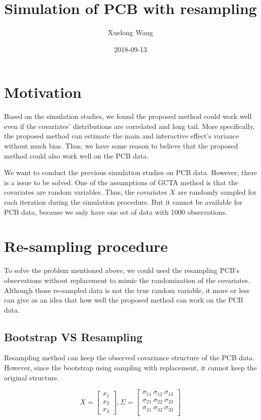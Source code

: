 \documentclass[]{article}
\title{Simulation of PCB with resampling}
\author{Xuelong Wang}
\date{2018-09-13}
\begin{document}
\maketitle

{
\setcounter{tocdepth}{2}
\tableofcontents
}
\section{Motivation}\label{motivation}

Based on the simulation studies, we found the proposed method could work
well even if the covariates' distributions are correlated and long tail.
More specifically, the proposed method can estimate the main and
interactive effect's variance without much bias. Thus, we have some
reason to believe that the proposed method could also work well on the
PCB data.

We want to conduct the previous simulation studies on PCB data. However,
there is a issue to be solved. One of the assumptions of GCTA method is
that the covariates are random variables. Thus, the covariates \(X\) are
randomly sampled for each iteration during the simulation procedure. But
it cannot be available for PCB data, because we only have one set of
data with 1000 observations.

\section{Re-sampling procedure}\label{re-sampling-procedure}

To solve the problem mentioned above, we could used the resampling PCB's
observations without replacement to mimic the randomization of the
covariates. Although those re-sampled data is not the true random
variable, it more or less can give as an idea that how well the proposed
method can work on the PCB data.

\subsection{Bootstrap VS Resampling}\label{bootstrap-vs-resampling}

Resampling method can keep the observed covariance structure of the PCB
data. However, since the bootstrap using sampling with replacement, it
cannot keep the original structure.

\[
  X = \begin{bmatrix}   
        x_1\\
        x_2\\
        x_3
      \end{bmatrix},
  \Sigma = \begin{bmatrix}   
        \sigma_{11} ~ \sigma_{12} ~ \sigma_{13}\\
        \sigma_{21} ~ \sigma_{22} ~ \sigma_{23}\\
        \sigma_{31} ~ \sigma_{32} ~ \sigma_{33}\\
      \end{bmatrix}
\]
\end{document}
